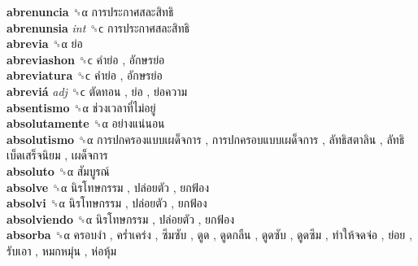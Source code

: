 \textbf{abrenuncia} ␝α   การประกาศสละสิทธิ   \\
\textbf{abrenunsia} \emph{int}  ␝ϲ   การประกาศสละสิทธิ   \\
\textbf{abrevia} ␝α   ย่อ   \\
\textbf{abreviashon} ␝ϲ   คำย่อ ,  อักษรย่อ   \\
\textbf{abreviatura} ␝ϲ   คำย่อ ,  อักษรย่อ   \\
\textbf{abreviá} \emph{adj}  ␝ϲ   ตัดทอน ,  ย่อ ,  ย่อความ   \\
\textbf{absentismo} ␝α   ช่วงเวลาที่ไม่อยู่   \\
\textbf{absolutamente} ␝α   อย่างแน่นอน   \\
\textbf{absolutismo} ␝α   การปกครองแบบเผด็จการ ,  การปกครอบแบบเผด็จการ ,  ลัทธิสตาลิน ,  ลัทธิเบ็ดเสร็จนิยม ,  เผด็จการ   \\
\textbf{absoluto} ␝α   สัมบูรณ์   \\
\textbf{absolve} ␝α   นิรโทษกรรม ,  ปล่อยตัว ,  ยกฟ้อง   \\
\textbf{absolvi} ␝α   นิรโทษกรรม ,  ปล่อยตัว ,  ยกฟ้อง   \\
\textbf{absolviendo} ␝α   นิรโทษกรรม ,  ปล่อยตัว ,  ยกฟ้อง   \\
\textbf{absorba} ␝α   ครอบงำ ,  คร่ำเคร่ง ,  ซึมซับ ,  ดูด ,  ดูดกลืน ,  ดูดซับ ,  ดูดซึม ,  ทำให้จดจ่อ ,  ย่อย ,  รับเอา ,  หมกหมุ่น ,  ห่อหุ้ม   \\
